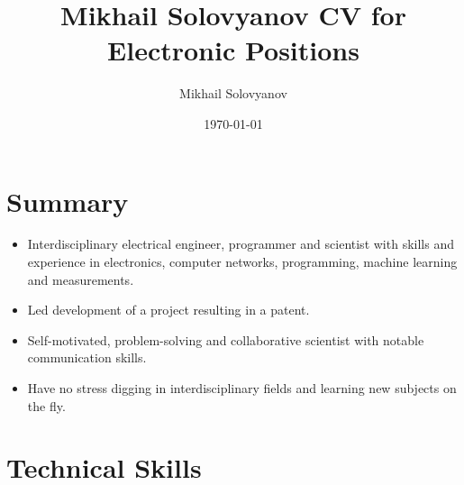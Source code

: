 \documentclass{article}
\title{ Mikhail Solovyanov CV for Electronic Positions}
\author{Mikhail Solovyanov}
\date{\today}
\begin{document}
 
 
\makecvtitle %
 
\section{Summary}
\begin{itemize}
\item Interdisciplinary electrical engineer, programmer and scientist with skills and experience in electronics, computer networks, programming, machine learning and measurements.
\item Led development of a  project resulting in a patent.
\item Self-motivated, problem-solving and collaborative scientist with notable communication skills.
\item Have no stress digging in interdisciplinary fields and learning new subjects on the fly.
\end{itemize}
 
\section{Technical Skills}
 
\end{document}
